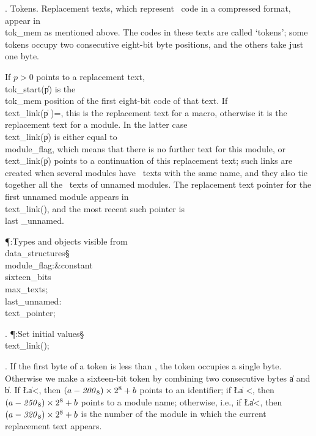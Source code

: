 .  Tokens.
Replacement texts, which represent \ADA\ code in a compressed format, appear
in \\{tok\_mem} as mentioned above. The codes in these texts are called
`tokens'; some tokens occupy two consecutive eight-bit byte positions, and
the others take just one byte.

If $p>0$ points to a replacement text, \\{tok\_start}\?(\?\|p\?)\? is the %
\\{tok\_mem}
position of the first eight-bit code of that text. If \\{text\_link}\?(\?\|p%
\?)=,
this is the replacement text for a macro, otherwise it is the replacement
text for a module. In the latter case \\{text\_link}\?(\?\|p\?)\? is either
equal to
\\{module\_flag}, which means that there is no further text for this module, or
\\{text\_link}\?(\?\|p\?)\? points to a continuation of this replacement text;
such links
are created when several modules have \ADA\ texts with the same name, and
they also tie together all the \ADA\ texts of unnamed modules. The
replacement text pointer for the first unnamed module appears in
\\{text\_link}\?(\?)\?, and the most recent such pointer is \\{last%
\_unnamed}.

\Y\P\?\4:Types and objects visible from \\{data\_structures}\X\mathrel{+}\S%
\?\6
\\{module\_flag}\?:\?\&{constant}\8\\{sixteen\_bits}\?\K\?\\{max\_texts};%
\6
\\{last\_unnamed}\?:\?\\{text\_pointer}\?\K{};\par
\fi

. \P\?:Set initial values\X\mathrel{+}\S\?\6
\\{text\_link}\?\1(\?\2)\K{};\par
\fi

. If the first byte of a token is less than \?\?, the token
occupies a
single byte. Otherwise we make a sixteen-bit token by combining two
consecutive bytes \|a and \|b. If \?\L\?\|a\?<\?, then
$(a-\bn{8}{200})\times2^8+b$ points to an identifier; if \?\L\?\|a%
\?<\?,
then $(a-\bn{8}{250})\times2^8+b$ points to a module name; otherwise, i.e.,
if \?\L\?\|a\?<\?, then $(a-\bn{8}{320})\times2^8+b$ is
the number of the
module in which the current replacement text appears.

